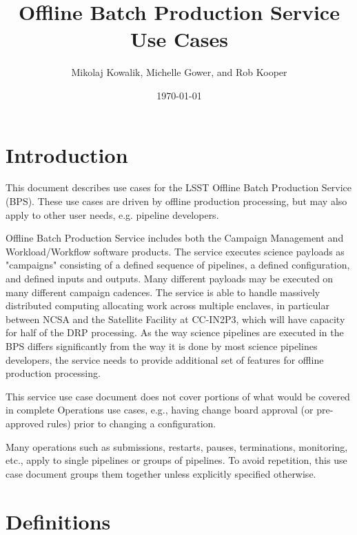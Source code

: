 \documentclass[DM,lsstdraft,toc]{lsstdoc}
\title{Offline Batch Production Service Use Cases}
\author{Mikolaj Kowalik, Michelle Gower, and Rob Kooper}
\date{\today}
\begin{document}
\maketitle

\section{Introduction}

This document describes use cases for the LSST Offline Batch Production
Service (BPS).  These use cases are driven by offline production
processing, but may also apply to other user needs, e.g. pipeline
developers.

Offline Batch Production Service includes both the Campaign Management and
Workload/Workflow software products.  The service executes science payloads as
"campaigns" consisting of a defined sequence of pipelines, a defined
configuration, and defined inputs and outputs.  Many different payloads may be
executed on many different campaign cadences.  The service is able to handle
massively distributed computing allocating work across multiple enclaves, in
particular between NCSA and the Satellite Facility at CC-IN2P3, which will have
capacity for half of the DRP processing.  As the way science pipelines are
executed in the BPS differs significantly from the way it is done by most
science pipelines developers, the service needs to provide additional set of
features for offline production processing.

This service use case document does not cover portions of what would be
covered in complete Operations use cases, e.g., having change board
approval (or pre-approved rules) prior to changing a configuration.    

Many operations such as submissions, restarts, pauses, terminations,
monitoring, etc., apply to single pipelines or groups of pipelines.  To avoid
repetition, this use case document groups them together unless explicitly
specified otherwise.

\section{Definitions}
\end{document}
